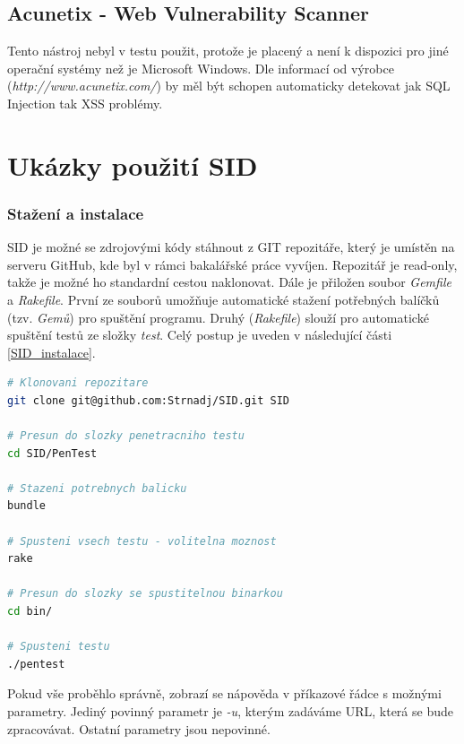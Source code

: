 \documentclass[12pt, a4paper]{report}
\begin{document}
\section{Acunetix - Web Vulnerability Scanner}
Tento nástroj nebyl v testu použit, protože je placený a není k dispozici pro jiné operační systémy než je Microsoft Windows. Dle informací od výrobce (\textit{http://www.acunetix.com/}) by měl být schopen automaticky detekovat jak SQL Injection tak XSS problémy.


\chapter{Ukázky použití SID}
\subsection{Stažení a instalace}
SID je možné se zdrojovými kódy stáhnout z GIT repozitáře, který je umístěn na serveru GitHub, kde byl v rámci bakalářské práce vyvíjen. Repozitář je read-only, takže je možné ho standardní cestou naklonovat. Dále je přiložen soubor \textit{Gemfile} a \textit{Rakefile}. První ze souborů umožňuje automatické stažení potřebných balíčků (tzv. \textit{Gemů}) pro spuštění programu. Druhý (\textit{Rakefile}) slouží pro automatické spuštění testů ze složky \textit{test}. Celý postup je uveden v následující části \ref{SID_instalace}.
\begin{lstlisting}[label=SID_instalace,language=Bash, caption=Instalace]
# Klonovani repozitare
git clone git@github.com:Strnadj/SID.git SID

# Presun do slozky penetracniho testu
cd SID/PenTest

# Stazeni potrebnych balicku
bundle

# Spusteni vsech testu - volitelna moznost
rake

# Presun do slozky se spustitelnou binarkou
cd bin/

# Spusteni testu
./pentest 

\end{lstlisting}
Pokud vše proběhlo správně, zobrazí se nápověda v příkazové řádce s možnými parametry. Jediný povinný parametr je \textit{-u}, kterým zadáváme URL, která se bude zpracovávat. Ostatní parametry jsou nepovinné.
\end{document}
